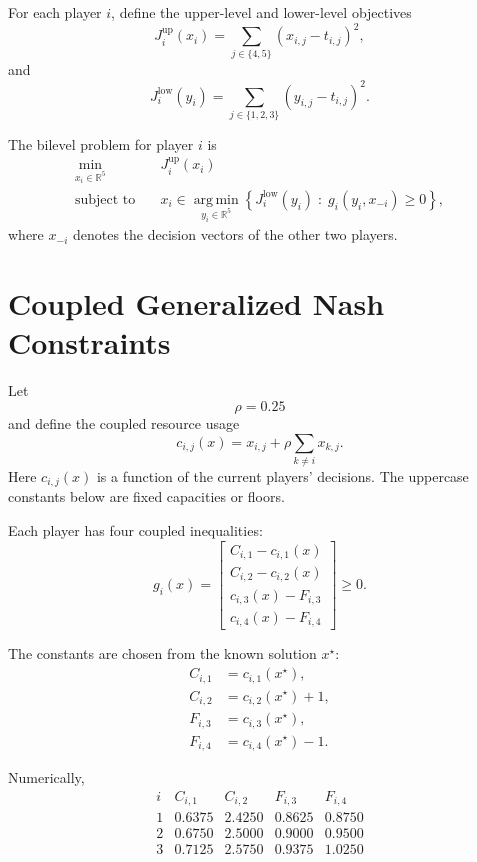 \documentclass[11pt]{article}
\begin{document}
For each player \(i\), define the upper-level and lower-level objectives
\[
  J_i^{\mathrm{up}}(x_i)
  =
  \sum_{j \in \{4,5\}} (x_{i,j}-t_{i,j})^2,
\]
and
\[
  J_i^{\mathrm{low}}(y_i)
  =
  \sum_{j \in \{1,2,3\}} (y_{i,j}-t_{i,j})^2.
\]

The bilevel problem for player \(i\) is
\[
\begin{aligned}
  \min_{x_i \in \mathbb{R}^5}
  \quad & J_i^{\mathrm{up}}(x_i)\\
  \text{subject to}
  \quad &
  x_i \in
  \operatorname*{arg\,min}_{y_i \in \mathbb{R}^5}
  \left\{
    J_i^{\mathrm{low}}(y_i)
    \;:\;
    g_i(y_i,x_{-i}) \ge 0
  \right\},
\end{aligned}
\]
where \(x_{-i}\) denotes the decision vectors of the other two players.

\section*{Coupled Generalized Nash Constraints}

Let
\[
  \rho = 0.25
\]
and define the coupled resource usage
\[
  c_{i,j}(x)
  =
  x_{i,j} + \rho \sum_{k \ne i} x_{k,j}.
\]
Here \(c_{i,j}(x)\) is a function of the current players' decisions. The
uppercase constants below are fixed capacities or floors.

Each player has four coupled inequalities:
\[
  g_i(x) =
  \begin{bmatrix}
    C_{i,1} - c_{i,1}(x)\\
    C_{i,2} - c_{i,2}(x)\\
    c_{i,3}(x) - F_{i,3}\\
    c_{i,4}(x) - F_{i,4}
  \end{bmatrix}
  \ge 0.
\]

The constants are chosen from the known solution \(x^\star\):
\[
\begin{aligned}
  C_{i,1} &= c_{i,1}(x^\star),\\
  C_{i,2} &= c_{i,2}(x^\star) + 1,\\
  F_{i,3} &= c_{i,3}(x^\star),\\
  F_{i,4} &= c_{i,4}(x^\star) - 1.
\end{aligned}
\]

Numerically,
\[
\begin{array}{c|cccc}
  i & C_{i,1} & C_{i,2} & F_{i,3} & F_{i,4}\\
  \hline
  1 & 0.6375 & 2.4250 & 0.8625 & 0.8750\\
  2 & 0.6750 & 2.5000 & 0.9000 & 0.9500\\
  3 & 0.7125 & 2.5750 & 0.9375 & 1.0250
\end{array}
\]
\end{document}

